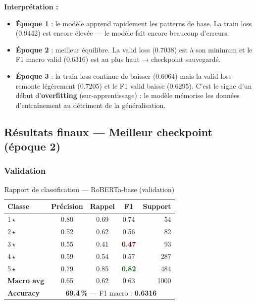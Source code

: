 \documentclass[12pt, a4paper]{article}
\begin{document}
\textbf{Interprétation :}
\begin{itemize}
  \item \textbf{Époque 1} : le modèle apprend rapidement les patterns de base.
        La train loss (0.9442) est encore élevée — le modèle fait encore beaucoup d'erreurs.
  \item \textbf{Époque 2} : meilleur équilibre. La valid loss (0.7038) est à son minimum
        et le F1 macro valid (0.6316) est au plus haut → checkpoint sauvegardé.
  \item \textbf{Époque 3} : la train loss continue de baisser (0.6064) mais la valid loss
        remonte légèrement (0.7205) et le F1 valid baisse (0.6295).
        C'est le signe d'un début d'\textbf{overfitting} (sur-apprentissage) :
        le modèle mémorise les données d'entraînement au détriment de la généralisation.
\end{itemize}

\subsection{Résultats finaux — Meilleur checkpoint (époque 2)}

\subsubsection{Validation}

\begin{table}[H]
  \centering
  \begin{tabular}{lcccr}
    \toprule
    \textbf{Classe} & \textbf{Précision} & \textbf{Rappel} & \textbf{F1} & \textbf{Support} \\
    \midrule
    1\,$\star$ & 0.80 & 0.69 & 0.74 &  54 \\
    2\,$\star$ & 0.52 & 0.62 & 0.56 &  82 \\
    3\,$\star$ & 0.55 & 0.41 & \textcolor{darkred}{\textbf{0.47}} &  93 \\
    4\,$\star$ & 0.59 & 0.54 & 0.57 & 287 \\
    5\,$\star$ & 0.79 & 0.85 & \textcolor{darkgreen}{\textbf{0.82}} & 484 \\
    \midrule
    \textbf{Macro avg} & 0.65 & 0.62 & 0.63 & 1000 \\
    \midrule
    \textbf{Accuracy} & \multicolumn{4}{c}{\textbf{69.4\,\%} — F1 macro : \textbf{0.6316}} \\
    \bottomrule
  \end{tabular}
  \caption{Rapport de classification — RoBERTa-base (validation)}
\end{table}
\end{document}
